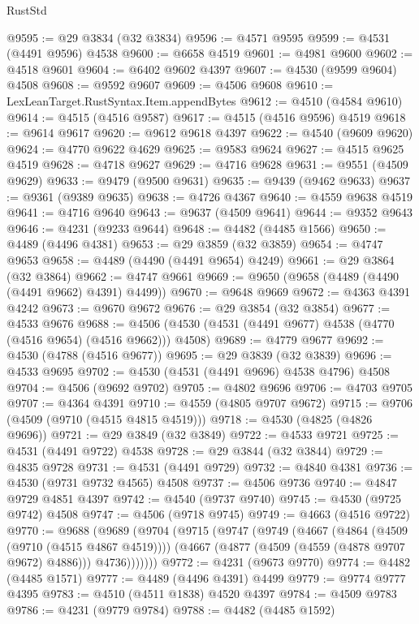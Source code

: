 \begin{lexlean}{RustStd}
\begin{coremodule}
@9595 := @29 @3834 (@32 @3834)
@9596 := @4571 @9595
@9599 := @4531 (@4491 @9596) @4538
@9600 := @6658 @4519
@9601 := @4981 @9600
@9602 := @4518 @9601
@9604 := @6402 @9602 @4397
@9607 := @4530 (@9599 @9604) @4508
@9608 := @9592 @9607
@9609 := @4506 @9608
@9610 := LexLeanTarget.RustSyntax.Item.appendBytes
@9612 := @4510 (@4584 @9610)
@9614 := @4515 (@4516 @9587)
@9617 := @4515 (@4516 @9596) @4519
@9618 := @9614 @9617
@9620 := @9612 @9618 @4397
@9622 := @4540 (@9609 @9620)
@9624 := @4770 @9622 @4629
@9625 := @9583 @9624
@9627 := @4515 @9625 @4519
@9628 := @4718 @9627
@9629 := @4716 @9628
@9631 := @9551 (@4509 @9629)
@9633 := @9479 (@9500 @9631)
@9635 := @9439 (@9462 @9633)
@9637 := @9361 (@9389 @9635)
@9638 := @4726 @4367
@9640 := @4559 @9638 @4519
@9641 := @4716 @9640
@9643 := @9637 (@4509 @9641)
@9644 := @9352 @9643
@9646 := @4231 (@9233 @9644)
@9648 := @4482 (@4485 @1566)
@9650 := @4489 (@4496 @4381)
@9653 := @29 @3859 (@32 @3859)
@9654 := @4747 @9653
@9658 := @4489 (@4490 (@4491 @9654) @4249)
@9661 := @29 @3864 (@32 @3864)
@9662 := @4747 @9661
@9669 := @9650 (@9658 (@4489 (@4490 (@4491 @9662) @4391) @4499))
@9670 := @9648 @9669
@9672 := @4363 @4391 @4242
@9673 := @9670 @9672
@9676 := @29 @3854 (@32 @3854)
@9677 := @4533 @9676
@9688 := @4506 (@4530 (@4531 (@4491 @9677) @4538 (@4770 (@4516 @9654) (@4516 @9662))) @4508)
@9689 := @4779 @9677
@9692 := @4530 (@4788 (@4516 @9677))
@9695 := @29 @3839 (@32 @3839)
@9696 := @4533 @9695
@9702 := @4530 (@4531 (@4491 @9696) @4538 @4796) @4508
@9704 := @4506 (@9692 @9702)
@9705 := @4802 @9696
@9706 := @4703 @9705
@9707 := @4364 @4391
@9710 := @4559 (@4805 @9707 @9672)
@9715 := @9706 (@4509 (@9710 (@4515 @4815 @4519)))
@9718 := @4530 (@4825 (@4826 @9696))
@9721 := @29 @3849 (@32 @3849)
@9722 := @4533 @9721
@9725 := @4531 (@4491 @9722) @4538
@9728 := @29 @3844 (@32 @3844)
@9729 := @4835 @9728
@9731 := @4531 (@4491 @9729)
@9732 := @4840 @4381
@9736 := @4530 (@9731 @9732 @4565) @4508
@9737 := @4506 @9736
@9740 := @4847 @9729 @4851 @4397
@9742 := @4540 (@9737 @9740)
@9745 := @4530 (@9725 @9742) @4508
@9747 := @4506 (@9718 @9745)
@9749 := @4663 (@4516 @9722)
@9770 := @9688
    (@9689
      (@9704
        (@9715
          (@9747
            (@9749
              (@4667
                (@4864 (@4509 (@9710 (@4515 @4867 @4519))))
                (@4667 (@4877 (@4509 (@4559 (@4878 @9707 @9672) @4886))) @4736)))))))
@9772 := @4231 (@9673 @9770)
@9774 := @4482 (@4485 @1571)
@9777 := @4489 (@4496 @4391) @4499
@9779 := @9774 @9777 @4395
@9783 := @4510 (@4511 @1838) @4520 @4397
@9784 := @4509 @9783
@9786 := @4231 (@9779 @9784)
@9788 := @4482 (@4485 @1592)

\end{coremodule}
\end{lexlean}

